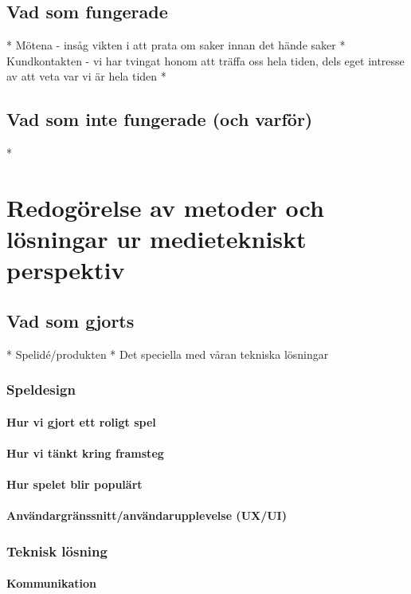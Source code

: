 \documentclass[a4paper,12pt,oneside,final]{extbook}
\begin{document}
\section{Vad som fungerade}
* Mötena - insåg vikten i att prata om saker innan det hände saker
* Kundkontakten - vi har tvingat honom att träffa oss hela tiden, dels eget intresse av att veta var vi är hela tiden
* 

\section{Vad som inte fungerade (och varför)}
* 

\chapter{Redogörelse av metoder och lösningar ur medietekniskt perspektiv}

\section{Vad som gjorts}
* Spelidé/produkten
* Det speciella med våran tekniska lösningar

\subsection{Speldesign}
\subsubsection{Hur vi gjort ett roligt spel}
\subsubsection{Hur vi tänkt kring framsteg}
\subsubsection{Hur spelet blir populärt}
\subsubsection{Användargränssnitt/användarupplevelse (UX/UI)}

\subsection{Teknisk lösning}
\subsubsection{Kommunikation}
\end{document}
